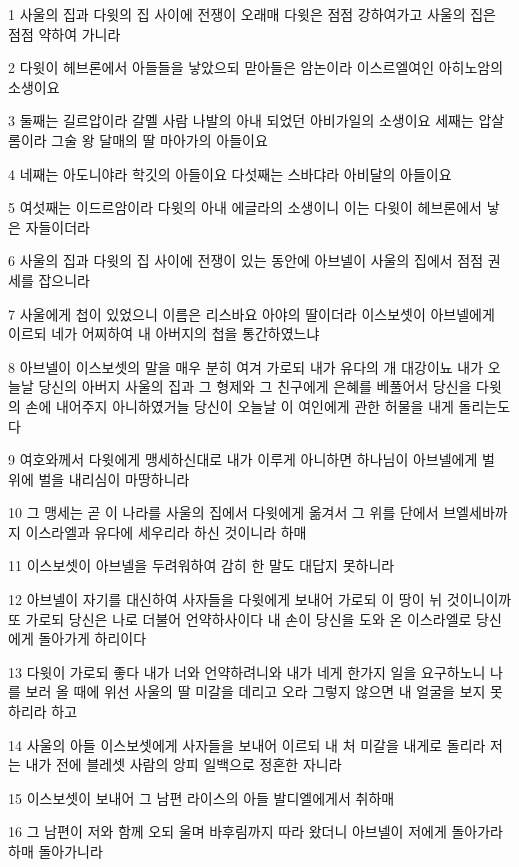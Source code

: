 \par 1 사울의 집과 다윗의 집 사이에 전쟁이 오래매 다윗은 점점 강하여가고 사울의 집은 점점 약하여 가니라
\par 2 다윗이 헤브론에서 아들들을 낳았으되 맏아들은 암논이라 이스르엘여인 아히노암의 소생이요
\par 3 둘째는 길르압이라 갈멜 사람 나발의 아내 되었던 아비가일의 소생이요 세째는 압살롬이라 그술 왕 달매의 딸 마아가의 아들이요
\par 4 네째는 아도니야라 학깃의 아들이요 다섯째는 스바댜라 아비달의 아들이요
\par 5 여섯째는 이드르암이라 다윗의 아내 에글라의 소생이니 이는 다윗이 헤브론에서 낳은 자들이더라
\par 6 사울의 집과 다윗의 집 사이에 전쟁이 있는 동안에 아브넬이 사울의 집에서 점점 권세를 잡으니라
\par 7 사울에게 첩이 있었으니 이름은 리스바요 아야의 딸이더라 이스보셋이 아브넬에게 이르되 네가 어찌하여 내 아버지의 첩을 통간하였느냐
\par 8 아브넬이 이스보셋의 말을 매우 분히 여겨 가로되 내가 유다의 개 대강이뇨 내가 오늘날 당신의 아버지 사울의 집과 그 형제와 그 친구에게 은혜를 베풀어서 당신을 다윗의 손에 내어주지 아니하였거늘 당신이 오늘날 이 여인에게 관한 허물을 내게 돌리는도다
\par 9 여호와께서 다윗에게 맹세하신대로 내가 이루게 아니하면 하나님이 아브넬에게 벌 위에 벌을 내리심이 마땅하니라
\par 10 그 맹세는 곧 이 나라를 사울의 집에서 다윗에게 옮겨서 그 위를 단에서 브엘세바까지 이스라엘과 유다에 세우리라 하신 것이니라 하매
\par 11 이스보셋이 아브넬을 두려워하여 감히 한 말도 대답지 못하니라
\par 12 아브넬이 자기를 대신하여 사자들을 다윗에게 보내어 가로되 이 땅이 뉘 것이니이까 또 가로되 당신은 나로 더불어 언약하사이다 내 손이 당신을 도와 온 이스라엘로 당신에게 돌아가게 하리이다
\par 13 다윗이 가로되 좋다 내가 너와 언약하려니와 내가 네게 한가지 일을 요구하노니 나를 보러 올 때에 위선 사울의 딸 미갈을 데리고 오라 그렇지 않으면 내 얼굴을 보지 못하리라 하고
\par 14 사울의 아들 이스보셋에게 사자들을 보내어 이르되 내 처 미갈을 내게로 돌리라 저는 내가 전에 블레셋 사람의 앙피 일백으로 정혼한 자니라
\par 15 이스보셋이 보내어 그 남편 라이스의 아들 발디엘에게서 취하매
\par 16 그 남편이 저와 함께 오되 울며 바후림까지 따라 왔더니 아브넬이 저에게 돌아가라 하매 돌아가니라
